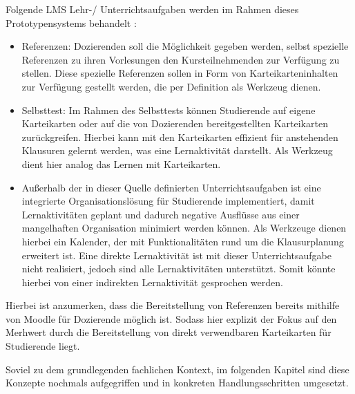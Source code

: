 Folgende \ac{LMS} Lehr-/ Unterrichtsaufgaben werden im Rahmen dieses Prototypensystems behandelt \autocite[S.248]{SCHOONENBOOM2014247}:
\begin{itemize}
	\item Referenzen: Dozierenden soll die Möglichkeit gegeben werden, selbst spezielle Referenzen zu ihren Vorlesungen den Kursteilnehmenden zur Verfügung zu stellen. Diese spezielle Referenzen sollen in Form von Karteikarteninhalten zur Verfügung gestellt werden, die per Definition als Werkzeug dienen.
	\item Selbsttest: Im Rahmen des Selbsttests können Studierende auf eigene Karteikarten oder auf die von Dozierenden bereitgestellten Karteikarten zurückgreifen. Hierbei kann mit den Karteikarten effizient für anstehenden Klausuren gelernt werden, was eine Lernaktivität darstellt. Als Werkzeug dient hier analog das Lernen mit Karteikarten.
	\item Außerhalb der in dieser Quelle definierten Unterrichtsaufgaben ist eine integrierte Organisationslösung für Studierende implementiert, damit Lernaktivitäten geplant und dadurch negative Ausflüsse aus einer mangelhaften Organisation minimiert werden können.	Als Werkzeuge dienen hierbei ein Kalender, der mit Funktionalitäten rund um die Klausurplanung erweitert ist. Eine direkte Lernaktivität ist mit dieser Unterrichtsaufgabe nicht realisiert, jedoch sind alle Lernaktivitäten unterstützt. Somit könnte hierbei von einer indirekten Lernaktivität gesprochen werden.
\end{itemize}

Hierbei ist anzumerken, dass die Bereitstellung von Referenzen bereits mithilfe von Moodle für Dozierende möglich ist. Sodass hier explizit der Fokus auf den Merhwert durch die Bereitstellung von direkt verwendbaren Karteikarten für Studierende liegt.

Soviel zu dem grundlegenden fachlichen Kontext, im folgenden Kapitel sind diese Konzepte nochmals aufgegriffen und in konkreten Handlungsschritten umgesetzt. 

%


